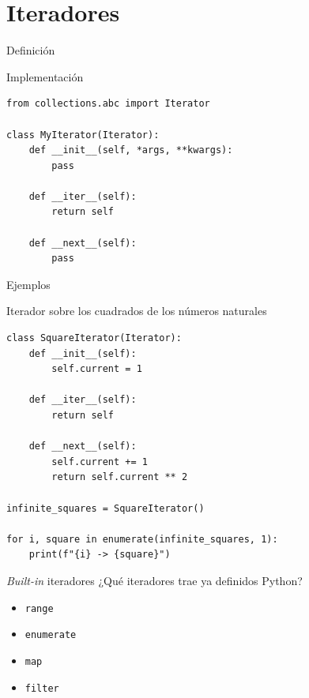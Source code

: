 \documentclass[11pt]{beamer}
\begin{document}
\section{Iteradores}
\begin{frame}[fragile]{Definición}
\begin{block}{Implementación}
\begin{verbatim}
from collections.abc import Iterator

class MyIterator(Iterator):
    def __init__(self, *args, **kwargs):
        pass

    def __iter__(self):
        return self

    def __next__(self):
        pass
\end{verbatim}
\end{block}   
\end{frame}

\begin{frame}[fragile]{Ejemplos}
\begin{block}{Iterador sobre los cuadrados de los números naturales}
\begin{verbatim}
class SquareIterator(Iterator):
    def __init__(self):
        self.current = 1

    def __iter__(self):
        return self

    def __next__(self):
        self.current += 1
        return self.current ** 2

infinite_squares = SquareIterator()

for i, square in enumerate(infinite_squares, 1):
    print(f"{i} -> {square}")
\end{verbatim}
\end{block}   
\end{frame}

\begin{frame}[fragile]{\textit{Built-in} iteradores}
¿Qué iteradores trae ya definidos Python?
\begin{itemize}
    \item \texttt{range}
    \item \texttt{enumerate}
    \item \texttt{map}
    \item \texttt{filter}
\end{itemize}
\end{frame}
\end{document}
